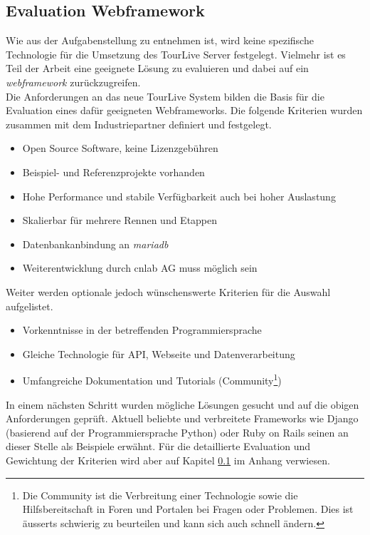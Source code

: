 \subsection{Evaluation Webframework}
\label{sec:evaluationwebframework}
Wie aus der Aufgabenstellung zu entnehmen ist, wird keine spezifische Technologie für die Umsetzung des TourLive Server festgelegt. Vielmehr ist es Teil der Arbeit eine geeignete Lösung zu evaluieren und dabei auf ein \textit{\gls{webframework}} zurückzugreifen.\\
Die Anforderungen an das neue TourLive System bilden die Basis für die Evaluation eines dafür geeigneten Webframeworks. Die folgende Kriterien wurden zusammen mit dem Industriepartner definiert und festgelegt.
\begin{itemize}
\item Open Source Software, keine Lizenzgebühren
\item Beispiel- und Referenzprojekte vorhanden
\item Hohe Performance und stabile Verfügbarkeit auch bei hoher Auslastung
\item Skalierbar für mehrere Rennen und Etappen
\item Datenbankanbindung an \textit{\gls{mariadb}}
\item Weiterentwicklung durch cnlab AG muss möglich sein
\end{itemize}

Weiter werden optionale jedoch wünschenswerte Kriterien für die Auswahl aufgelistet.
\begin{itemize}
\item Vorkenntnisse in der betreffenden Programmiersprache
\item Gleiche Technologie für API, Webseite und Datenverarbeitung
\item Umfangreiche Dokumentation und Tutorials (Community\footnote{Die Community ist die Verbreitung einer Technologie sowie die Hilfsbereitschaft in Foren und Portalen bei Fragen oder Problemen. Dies ist äusserts schwierig zu beurteilen und kann sich auch schnell ändern.})
\end{itemize}

In einem nächsten Schritt wurden mögliche Lösungen gesucht und auf die obigen Anforderungen geprüft. Aktuell beliebte und verbreitete Frameworks wie Django (basierend auf der Programmiersprache Python) oder Ruby on Rails seinen an dieser Stelle als Beispiele erwähnt. Für die detaillierte Evaluation und Gewichtung der Kriterien wird aber auf Kapitel \ref{sec:evaluationwebframework} im Anhang verwiesen.

